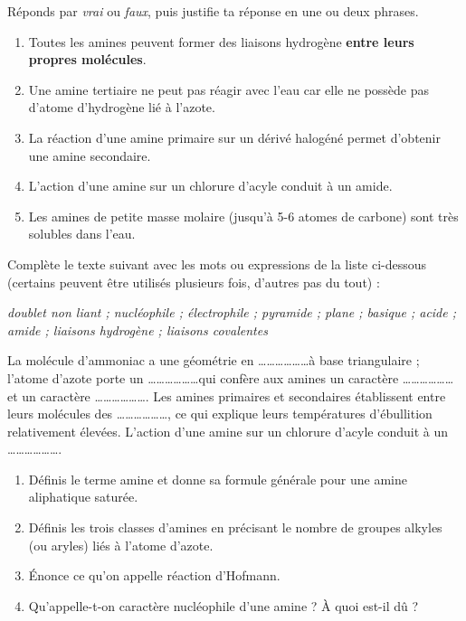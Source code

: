 \documentclass[11pt]{article}
\newcommand{\cle}[1]{{\popxbold\color{popdark}#1}}
\begin{document}
\begin{exercice}
Réponds par \emph{vrai} ou \emph{faux}, puis justifie ta réponse en une ou deux phrases.
\begin{enumerate}
\item Toutes les amines peuvent former des liaisons hydrogène \textbf{entre leurs propres molécules}.
\item Une amine tertiaire ne peut pas réagir avec l'eau car elle ne possède pas d'atome d'hydrogène lié à l'azote.
\item La réaction d'une amine primaire sur un dérivé halogéné permet d'obtenir une amine secondaire.
\item L'action d'une amine sur un chlorure d'acyle conduit à un amide.
\item Les amines de petite masse molaire (jusqu'à 5-6 atomes de carbone) sont très solubles dans l'eau.
\end{enumerate}
\end{exercice}

\begin{exercice}
Complète le texte suivant avec les mots ou expressions de la liste ci-dessous (certains peuvent être utilisés plusieurs fois, d'autres pas du tout) :
\medskip
\begin{center}
\emph{doublet non liant ; nucléophile ; électrophile ; pyramide ; plane ; basique ; acide ; amide ; liaisons hydrogène ; liaisons covalentes}
\end{center}
\medskip
La molécule d'ammoniac  a une géométrie en \ldots\ldots\ldots\ldots\ldots\ldots à base triangulaire ; l'atome d'azote porte un \ldots\ldots\ldots\ldots\ldots\ldots qui confère aux amines un caractère \ldots\ldots\ldots\ldots\ldots\ldots et un caractère \ldots\ldots\ldots\ldots\ldots\ldots. Les amines primaires et secondaires établissent entre leurs molécules des \ldots\ldots\ldots\ldots\ldots\ldots, ce qui explique leurs températures d'ébullition relativement élevées. L'action d'une amine sur un chlorure d'acyle conduit à un \ldots\ldots\ldots\ldots\ldots\ldots.
\end{exercice}

\begin{exercice}
\begin{enumerate}
\item Définis le terme \cle{amine} et donne sa formule générale pour une amine aliphatique saturée.
\item Définis les trois classes d'amines en précisant le nombre de groupes alkyles (ou aryles) liés à l'atome d'azote.
\item Énonce ce qu'on appelle \cle{réaction d'Hofmann}.
\item Qu'appelle-t-on \cle{caractère nucléophile} d'une amine ? À quoi est-il dû ?
\end{enumerate}
\end{exercice}
\end{document}
